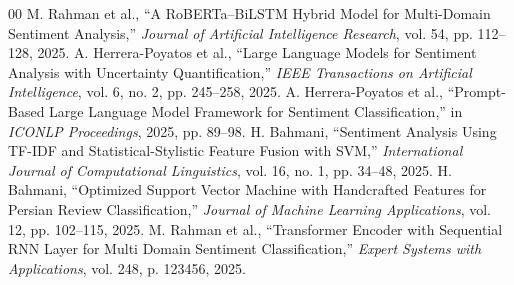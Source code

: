 \documentclass[conference]{IEEEtran}
\begin{document}
\begin{thebibliography}{00}
 M. Rahman et al., ``A RoBERTa–BiLSTM Hybrid Model for Multi-Domain Sentiment Analysis,'' \textit{Journal of Artificial Intelligence Research}, vol. 54, pp. 112--128, 2025.
 A. Herrera-Poyatos et al., ``Large Language Models for Sentiment Analysis with Uncertainty Quantification,'' \textit{IEEE Transactions on Artificial Intelligence}, vol. 6, no. 2, pp. 245--258, 2025.
 A. Herrera-Poyatos et al., ``Prompt-Based Large Language Model Framework for Sentiment Classification,'' in \textit{ICONLP Proceedings}, 2025, pp. 89--98.
 H. Bahmani, ``Sentiment Analysis Using TF-IDF and Statistical-Stylistic Feature Fusion with SVM,'' \textit{International Journal of Computational Linguistics}, vol. 16, no. 1, pp. 34--48, 2025.
 H. Bahmani, ``Optimized Support Vector Machine with Handcrafted Features for Persian Review Classification,'' \textit{Journal of Machine Learning Applications}, vol. 12, pp. 102--115, 2025.
 M. Rahman et al., ``Transformer Encoder with Sequential RNN Layer for Multi Domain Sentiment Classification,'' \textit{Expert Systems with Applications}, vol. 248, p. 123456, 2025.
\end{thebibliography}
\end{document}
